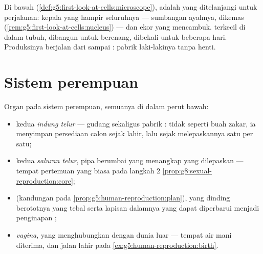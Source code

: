 \begin{example}\label{ex:g8:reproductive-systems:sperm}
Di bawah 
(\cref{def:g5:first-look-at-cells:microscope}), 
adalah  yang ditelanjangi untuk perjalanan: kepala yang
hampir seluruhnya  --- sumbangan ayahnya, dikemas
(\cref{rem:g5:first-look-at-cells:nucleus}) --- dan ekor
yang mencambuk.  terkecil di dalam tubuh, dibangun untuk
berenang, dibekali untuk beberapa hari. Produksinya berjalan
dari  sampai : pabrik laki-lakinya tanpa henti.
\end{example}

\section{Sistem perempuan}

\begin{definition}\label{def:g8:reproductive-systems:female}
Organ pada sistem perempuan, semuanya di dalam perut bawah:
\begin{itemize}
  \item kedua \emph{indung telur} ---
        gudang sekaligus pabrik : tidak seperti buah
        zakar, ia menyimpan persediaan calon \emph{}
        sejak lahir, lalu sejak  melepaskannya satu
        per satu;
  \item kedua \emph{saluran telur},
        pipa berumbai yang menangkap  yang
        dilepaskan --- tempat pertemuan yang biasa pada
        langkah 2 \cref{prop:g8:sexual-reproduction:core};
  \item \emph{} (kandungan pada
        \cref{prop:g5:human-reproduction:plan}), yang
        dinding berototnya yang tebal serta lapisan dalamnya
        yang dapat diperbarui menjadi penginapan ;
  \item \emph{vagina}, yang menghubungkan  dengan dunia
        luar --- tempat air mani diterima, dan jalan lahir
        pada \cref{ex:g5:human-reproduction:birth}.
\end{itemize}
\end{definition}

